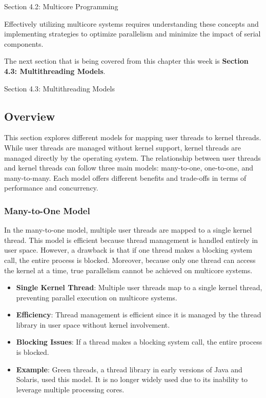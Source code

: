 \begin{notes}{Section 4.2: Multicore Programming}
\begin{highlight}
    Effectively utilizing multicore systems requires understanding these concepts and implementing strategies to optimize parallelism and minimize the impact of serial components.
    
    \end{highlight}
\end{notes}

The next section that is being covered from this chapter this week is \textbf{Section 4.3: Multithreading Models}.

\begin{notes}{Section 4.3: Multithreading Models}
    \subsection*{Overview}

    This section explores different models for mapping user threads to kernel threads. While user threads are managed without kernel support, kernel threads are managed directly by the operating system. 
    The relationship between user threads and kernel threads can follow three main models: many-to-one, one-to-one, and many-to-many. Each model offers different benefits and trade-offs in terms of 
    performance and concurrency.
    
    \subsubsection*{Many-to-One Model}
    
    In the many-to-one model, multiple user threads are mapped to a single kernel thread. This model is efficient because thread management is handled entirely in user space. However, a drawback is 
    that if one thread makes a blocking system call, the entire process is blocked. Moreover, because only one thread can access the kernel at a time, true parallelism cannot be achieved on multicore systems.
    
    \begin{highlight}
    
        \begin{itemize}
            \item \textbf{Single Kernel Thread}: Multiple user threads map to a single kernel thread, preventing parallel execution on multicore systems.
            \item \textbf{Efficiency}: Thread management is efficient since it is managed by the thread library in user space without kernel involvement.
            \item \textbf{Blocking Issues}: If a thread makes a blocking system call, the entire process is blocked.
            \item \textbf{Example}: Green threads, a thread library in early versions of Java and Solaris, used this model. It is no longer widely used due to its inability to leverage multiple processing cores.
        \end{itemize}
    

\end{highlight}
\end{notes}
